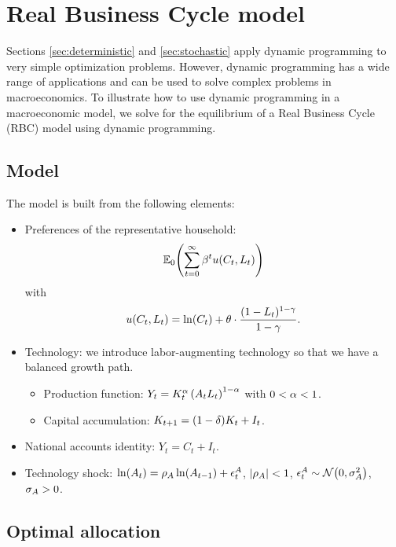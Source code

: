 \documentclass[letterpaper, 11pt, leqno]{article}
\begin{document}
\section{Real Business Cycle model}

Sections \ref{sec:deterministic} and \ref{sec:stochastic} apply dynamic programming to very simple optimization problems. However, dynamic programming has a wide range of applications and can be used to solve complex problems in macroeconomics. To illustrate how to use dynamic programming in a macroeconomic model, we solve for the equilibrium of a Real Business Cycle (RBC) model using dynamic programming.

\subsection{Model}

The model is built from the following elements:
\begin{itemize}
\item Preferences of the representative household: 
\begin{equation*}
\E[0]{\sum_{t=0}^{\infty}\b^t u(C_{t},L_{t})}
\end{equation*}
with 
\begin{equation*}
u(C_{t},L_{t}) =\ln{C_{t}} +\t \cdot \frac{(1-L_{t})^{1-\g}}{1-\g}.
\end{equation*}
\item Technology: we introduce labor-augmenting technology so that we have a balanced growth path.
\begin{itemize}
\item Production function: $Y_{t}=K_{t}^{\alpha} \left( A_{t} L_{t} \right)^{1-\alpha}$ with $0<\alpha<1$.
\item Capital accumulation: $K_{t+1}= (1-\delta) K_{t}+I_{t}$.
\end{itemize}
\item National accounts identity: $Y_{t} =C_{t}+I_{t}$.
\item Technology shock: $\ln{A_{t}} =\r_{A} \ln{A_{t-1}} +\e^{A}_{t}$, $\left\lvert \rho_{A} \right\rvert<1$, $\epsilon^{A}_{t}\sim \mathcal{N}{\left( 0,\sigma_{A}^{2} \right)}$, $\sigma_{A}>0$.
\end{itemize}

\subsection{Optimal allocation}
\end{document}
